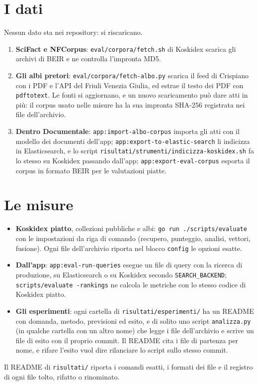 \section*{I dati}

Nessun dato sta nei repository: si riscaricano.
\begin{enumerate}
  \item \textbf{SciFact e NFCorpus}: \texttt{eval/corpora/fetch.sh} di Koskidex
        scarica gli archivi di BEIR e ne controlla l'impronta MD5.
  \item \textbf{Gli albi pretori}: \texttt{eval/corpora/fetch-albo.py} scarica il
        feed di Crispiano con i PDF e l'API del Friuli Venezia Giulia, ed estrae
        il testo dei PDF con \texttt{pdftotext}. Le fonti si aggiornano, e un
        nuovo scaricamento può dare atti in più: il corpus usato nelle misure ha
        la sua impronta SHA-256 registrata nei file dell'archivio.
  \item \textbf{Dentro Documentale}: \texttt{app:import-albo-corpus} importa gli
        atti con il modello dei documenti dell'app;
        \texttt{app:export-to-elastic-search} li indicizza in Elasticsearch, e lo
        script \texttt{risultati/strumenti/indicizza-koskidex.sh} fa lo stesso su Koskidex
        passando dall'app; \texttt{app:export-eval-corpus} esporta il corpus in
        formato BEIR per le valutazioni piatte.
\end{enumerate}

\section*{Le misure}

\begin{itemize}
  \item \textbf{Koskidex piatto}, collezioni pubbliche e albi:
        \texttt{go run ./scripts/evaluate} con le impostazioni da riga di comando
        (recupero, punteggio, analisi, vettori, fusione). Ogni file dell'archivio
        riporta nel blocco \texttt{config} le opzioni esatte.
  \item \textbf{Dall'app}: \texttt{app:eval-run-queries} esegue un file di query
        con la ricerca di produzione, su Elasticsearch o su Koskidex secondo
        \texttt{SEARCH\_BACKEND}; \texttt{scripts/evaluate -rankings} ne calcola
        le metriche con lo stesso codice di Koskidex piatto.
  \item \textbf{Gli esperimenti}: ogni cartella di
        \texttt{risultati/esperimenti/} ha un README con domanda, metodo,
        previsioni ed esito, e di solito uno script \texttt{analizza.py} (in qualche
        cartella con un altro nome) che legge i file
        dell'archivio e scrive un file di esito con il proprio commit. Il README
        cita i file di partenza per nome, e rifare l'esito vuol dire rilanciare lo
        script sullo stesso commit.
\end{itemize}

Il README di \texttt{risultati/} riporta i comandi esatti, i formati dei file e il
registro di ogni file tolto, rifatto o rinominato.
